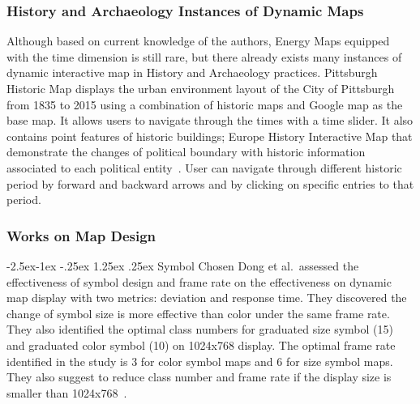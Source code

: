 \documentclass[hidelinks,12pt]{article}
\makeatletter
\renewcommand\paragraph{\@startsection{paragraph}{4}{\z@}%
            {-2.5ex\@plus -1ex \@minus -.25ex}%
            {1.25ex \@plus .25ex}%
            {\normalfont\normalsize\bfseries}}
\makeatother
\begin{document}
\subsubsection{History and Archaeology Instances of Dynamic Maps}
Although based on current knowledge of the authors, Energy Maps
equipped with the time dimension is still rare, but there already
exists many instances of dynamic interactive map in History and
Archaeology practices. Pittsburgh Historic Map displays the urban
environment layout of the City of Pittsburgh from 1835 to 2015 using a
combination of historic maps and Google map as the base map. It allows
users to navigate through the times with a time slider. It also
contains point features of historic buildings\cite{EsriHistory2015};
Europe History Interactive Map that demonstrate the changes of
political boundary with historic information associated to each
political entity~\cite{Worldology2009}. User can navigate through
different historic period by forward and backward arrows and by
clicking on specific entries to that period.

\subsubsection{Works on Map Design}\label{mapDesign}
\paragraph{Symbol Chosen}
Dong et al.\ assessed the effectiveness of symbol design and frame
rate on the effectiveness on dynamic map display with two metrics:
deviation and response time. They discovered the change of symbol size
is more effective than color under the same frame rate. They also
identified the optimal class numbers for graduated size symbol (15)
and graduated color symbol (10) on 1024x768 display. The optimal frame
rate identified in the study is 3 for color symbol maps and 6 for size
symbol maps. They also suggest to reduce class number and frame rate
if the display size is smaller than
1024x768~\cite{doi:10.1559/1523040639298}.
\end{document}
